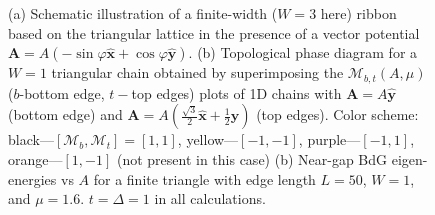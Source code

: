 \documentclass[aps,prb,twocolumn,showpacs,amsmath,amssymb,superscriptaddress]{revtex4-2}
\let\oldhat\hat
\renewcommand{\hat}[1]{\oldhat{\mathbf{#1}}}
\begin{document}
\begin{figure}[ht]
  \\
  \hspace{10pt}
   \\
  \hspace{-20pt}
  \caption{(a) Schematic illustration of a finite-width ($W=3$ here) ribbon based on the triangular lattice in the presence of a vector potential $\mathbf A = A(-\sin\varphi \hat{x} + \cos\varphi \hat{y})$. (b) Topological phase diagram for a $W=1$ triangular chain obtained by superimposing the $\mathcal{M}_{b,t}(A, \mu)$ ($b$-bottom edge, $t-$top edges) plots of 1D chains with $\mathbf A = A\hat{y}$ (bottom edge) and $\mathbf A = A(\frac{\sqrt{3}}{2}\hat{x}+\frac{1}{2}\hat{y})$ (top edges). Color scheme: black---$[\mathcal{M}_b,\mathcal{M}_t]=[1,1]$, yellow---$[-1,-1]$, purple---$[-1,1]$, orange---$[1,-1]$ (not present in this case) (b) Near-gap BdG eigen-energies vs $A$ for a finite triangle with edge length $L = 50$, $W=1$, and $\mu=1.6$. $t=\Delta =1$ in all calculations.}
  \label{fig: pd}
\end{figure}
\end{document}
